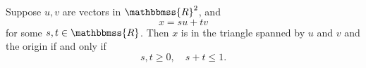 \documentclass[12pt]{article}
\newcommand{\R}{\mathbbmss{R}}
\begin{document}
Suppose $u,v$ are vectors in $\R^2$, and
$$
  x = s u + tv
$$
for some $s,t\in \R$. Then $x$ is in the triangle
spanned by $u$ and $v$ and the origin if and only if
$$
  s,t\ge 0, \quad s+t\le 1.
$$
\end{document}
